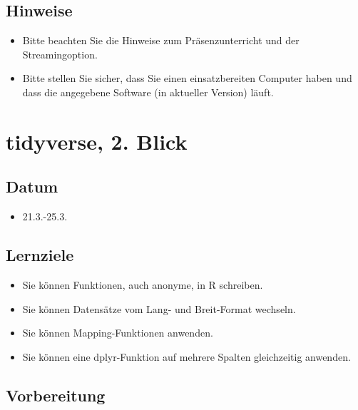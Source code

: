 \documentclass[
]{book}
\providecommand{\tightlist}{%
  \setlength{\itemsep}{0pt}\setlength{\parskip}{0pt}}
\begin{document}
\hypertarget{hinweise}{%
\subsection{Hinweise}\label{hinweise}}

\begin{itemize}
\tightlist
\item
  Bitte beachten Sie die Hinweise zum Präsenzunterricht und der Streamingoption.
\item
  Bitte stellen Sie sicher, dass Sie einen einsatzbereiten Computer haben und dass die angegebene Software (in aktueller Version) läuft.
\end{itemize}

\hypertarget{tidyverse-2.-blick}{%
\section{tidyverse, 2. Blick}\label{tidyverse-2.-blick}}

\hypertarget{datum-1}{%
\subsection{Datum}\label{datum-1}}

\begin{itemize}
\tightlist
\item
  21.3.-25.3.
\end{itemize}

\hypertarget{lernziele-2}{%
\subsection{Lernziele}\label{lernziele-2}}

\begin{itemize}
\tightlist
\item
  Sie können Funktionen, auch anonyme, in R schreiben.
\item
  Sie können Datensätze vom Lang- und Breit-Format wechseln.
\item
  Sie können Mapping-Funktionen anwenden.
\item
  Sie können eine dplyr-Funktion auf mehrere Spalten gleichzeitig anwenden.
\end{itemize}

\hypertarget{vorbereitung-1}{%
\subsection{Vorbereitung}\label{vorbereitung-1}}
\end{document}
